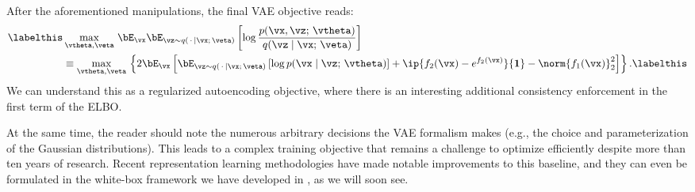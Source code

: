 \documentclass[../../book-main.tex]{subfiles}
\begin{document}
After the aforementioned manipulations, the final VAE objective reads:
\begin{align*}\labelthis\label{eq:elbo-objective}
&\max_{\vtheta, \veta}\,
\bE_{\vx}
\bE_{\vz \sim q(\,\cdot\, \mid \vx ;\, \veta)} \left[
  \log \frac{p(\vx, \vz;\, \vtheta)}{q(\vz \mid \vx;\, \veta)}
\right]\\
&\equiv
\max_{\vtheta, \veta}\,
\left\{
  2\bE_{\vx}\left[
    \bE_{\vz \sim q(\,\cdot\, \mid \vx ;\, \veta)} \left[
      \log p(\vx \mid \vz;\, \vtheta)
    \right]
    + \ip{ f_2(\vx) - e^{f_2(\vx)}}{\mathbf{1}}
    - \norm{f_1(\vx)}_2^2
  \right]
\right\}. \labelthis \label{eq:elbo-for-gaussians}
\end{align*}
We can understand this as a regularized autoencoding objective, where there is
an interesting additional consistency enforcement in the first term of the ELBO.

At the same time, the reader should note the numerous arbitrary decisions
the VAE formalism makes (e.g., the choice and parameterization of the Gaussian
distributions). This leads to a complex training objective that remains
a challenge to optimize efficiently despite more than ten years of research.
Recent representation learning methodologies have made notable improvements to
this baseline, and they can even be formulated in the white-box framework we
have developed in , as we will soon see.

\end{document}
